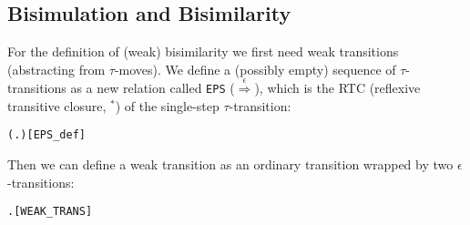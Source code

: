 
\subsection{Bisimulation and Bisimilarity}


For the definition of (weak) bisimilarity we first need weak
transitions (abstracting from $\tau$-moves). 
We define a (possibly empty) sequence of $\tau$-transitions as
a new relation called \texttt{EPS} ($\overset{\epsilon}{\Rightarrow}$), which is the RTC
(reflexive transitive closure, $^*$) of the single-step $\tau$-transition:
\begin{alltt}
 \HOLSymConst{=} (\HOLTokenLambda{} .  \HOLTokenTransBegin\HOLSymConst{\ensuremath{\tau}}\HOLTokenTransEnd {})\HOLSymConst{\HOLTokenSupStar{}}\hfill{[EPS_def]}
\end{alltt}
Then we can define a weak transition as an ordinary transition wrapped by
two $\epsilon$-transitions:
\begin{alltt}
 \HOLTokenWeakTransBegin{}\HOLTokenWeakTransEnd {} \HOLSymConst{\HOLTokenEquiv{}} \HOLSymConst{\HOLTokenExists{}} .  \HOLSymConst{\HOLTokenEPS}  \HOLSymConst{\HOLTokenConj{}}  \HOLTokenTransBegin{}\HOLTokenTransEnd {} \HOLSymConst{\HOLTokenConj{}}  \HOLSymConst{\HOLTokenEPS} \hfill{[WEAK_TRANS]}
\end{alltt}




